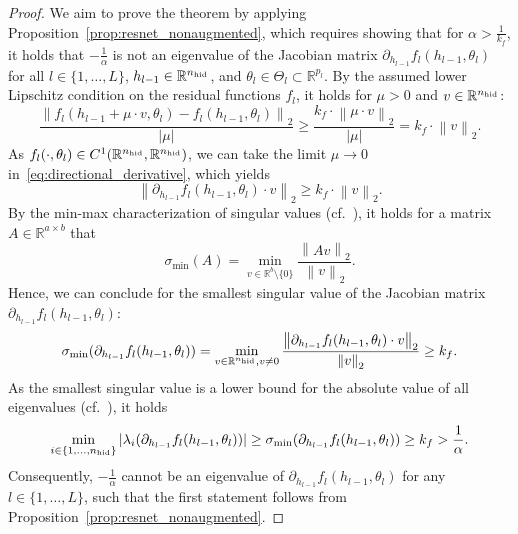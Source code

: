 \documentclass[10pt]{article}
\theoremstyle{definition}
\numberwithin{equation}{section}
\newcommand\norm[1]{\left\lVert#1\right\rVert}
\newcommand\abs[1]{\left\lvert#1\right\rvert}
\newcommand{\R}{\mathbb{R}}
\newcommand*{\nhid}{n_\textup{hid}}
\begin{document}
\begin{proof}
	We aim to prove the theorem by applying Proposition~\ref{prop:resnet_nonaugmented}, which requires showing that for $\alpha > \frac{1}{k_f}$, it holds that $- \frac{1}{\alpha}$ is not an eigenvalue of the Jacobian matrix $\partial_{h_{l-1}}f_l(h_{l-1},\theta_l)$ for all $l \in \{1,\ldots,L\}$, $h_{l-1} \in \R^{\nhid}$, and $\theta_l \in \Theta_l \subset \R^{p_l}$. By the assumed lower Lipschitz condition on the residual functions $f_l$, it holds for $\mu>0$ and $v \in \R^{\nhid}$:
	\begin{equation} \label{eq:directional_derivative}
		\frac{\norm{f_l(h_{l-1} + \mu \cdot v,\theta_l) - f_l(h_{l-1},\theta_l)}_2}{\abs{\mu}} \geq \frac{k_f \cdot \norm{\mu \cdot v}_2}{\abs{\mu}} = k_f \cdot \norm{v}_2.
	\end{equation}
	As $f_l(\cdot,\theta_l)\in C^1(\R^{\nhid},\R^{\nhid})$, we can take the limit $\mu \rightarrow 0$ in~\eqref{eq:directional_derivative}, which yields
	\begin{equation} \label{eq:directional_derivative_2}
		\norm{\partial_{h_{l-1}}f_l(h_{l-1},\theta_l) \cdot v}_2 
        \geq k_f \cdot \norm{v}_2.
	\end{equation}
	By the min-max characterization of singular values (cf.~\cite{Horn2012}), it holds for a matrix $A \in \R^{a \times b}$ that
	\begin{equation}\label{eq:singularvalues}
		\sigma_{\min}(A) =  \min_{v \in \R^{b} \setminus \{0\}} \frac{\norm{Av}_2}{\norm{v}_2}.
	\end{equation}
	Hence, we can conclude for the smallest singular value of the Jacobian matrix  $\partial_{h_{l-1}}f_l(h_{l-1},\theta_l)$: 
	\begin{equation*}
		\sigma_{\min}(\partial_{h_{l-1}}f_l(h_{l-1},\theta_l)) =  \min_{v \in \R^{\nhid},v\neq 0} \frac{\norm{	\partial_{h_{l-1}}f_l(h_{l-1},\theta_l) \cdot v}_2}{\norm{v}_2} \geq k_f.
	\end{equation*}
	As the smallest singular value is a lower bound for the absolute value of all eigenvalues (cf.~\cite{Horn2012}), it holds  
	\begin{equation*}
		\min_{i \in \{1,\ldots,\nhid\}} \vert \lambda_i(\partial_{h_{l-1}}f_l(h_{l-1},\theta_l)) \vert  \geq  \sigma_{\min}(\partial_{h_{l-1}}f_l(h_{l-1},\theta_l)) \geq k_f > \frac{1}{\alpha}.
	\end{equation*}
	Consequently, $-\frac{1}{\alpha}$ cannot be an eigenvalue of $\partial_{h_{l-1}}f_l(h_{l-1},\theta_l)$ for any $l \in \{1,\ldots,L\}$, such that the first statement follows from Proposition~\ref{prop:resnet_nonaugmented}.
	

\end{proof}
\end{document}

